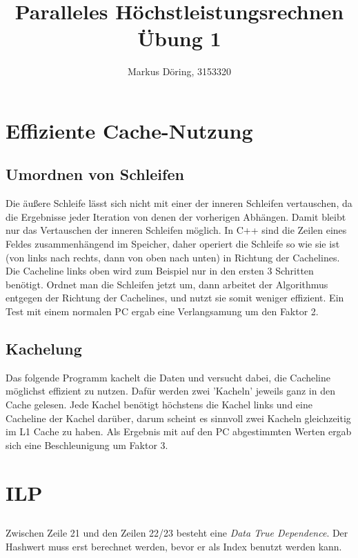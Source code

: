 \documentclass[11pt,a4paper]{scrartcl}
\begin{document}
\title{Paralleles Höchstleistungsrechnen Übung 1}
\author{Markus Döring, 3153320}
\maketitle

\section{Effiziente Cache-Nutzung}
\subsection{Umordnen von Schleifen}
Die äußere Schleife lässt sich nicht mit einer der inneren Schleifen vertauschen, da 
die Ergebnisse jeder Iteration von denen der vorherigen Abhängen. Damit bleibt nur das 
Vertauschen der inneren Schleifen möglich. In C++ sind die Zeilen eines Feldes zusammenhängend 
im Speicher, daher operiert die Schleife so wie sie ist (von links nach rechts, dann von oben 
nach unten) in Richtung der Cachelines. Die Cacheline links oben wird zum Beispiel nur in den 
ersten 3 Schritten benötigt. Ordnet man die Schleifen jetzt um, dann arbeitet der Algorithmus 
entgegen der Richtung der Cachelines, und nutzt sie somit weniger effizient. Ein Test mit 
einem normalen PC ergab eine Verlangsamung um den Faktor 2.

\subsection{Kachelung}
Das folgende Programm kachelt die Daten und versucht dabei, die Cacheline möglichst effizient 
zu nutzen. Dafür werden zwei 'Kacheln' jeweils ganz in den Cache gelesen. Jede Kachel benötigt 
höchstens die Kachel links und eine Cacheline der Kachel darüber, darum scheint es sinnvoll zwei 
Kacheln gleichzeitig im L1 Cache zu haben. Als Ergebnis mit auf den PC abgestimmten Werten ergab 
sich eine Beschleunigung um Faktor 3.
\newpage



\section{ILP}
\subsection{}
Zwischen Zeile 21 und den Zeilen 22/23 besteht eine \emph{Data True Dependence}. Der Hashwert muss erst 
berechnet werden, bevor er als Index benutzt werden kann.
\end{document}
